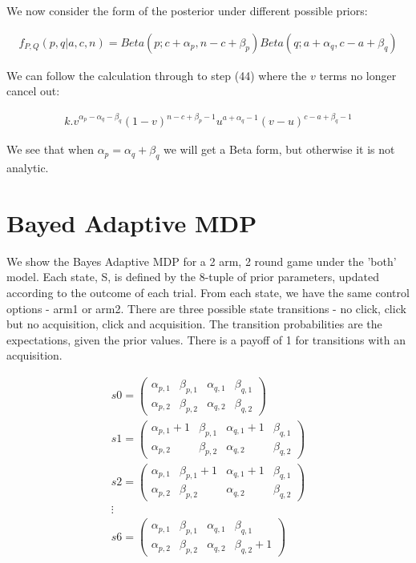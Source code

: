 \documentclass[11pt,a4,singlespacing,titlepagenumber=on]{scrreprt}
\numberwithin{equation}{chapter} %
\theoremstyle{remark}
\begin{document}
We now consider the form of the posterior under different possible priors:

\begin{align}
 f_{P,Q}(p,q|a,c,n) = Beta(p;c+\alpha_p,n-c+\beta_p) Beta(q;a+\alpha_q,c-a+\beta_q)
\end{align}

We can follow the calculation through to step (44) where the $v$ terms no longer cancel out:

\begin{align}
 k . v^{\alpha_p - \alpha_q - \beta_q}(1-v)^{n-c+\beta_p-1} u^{a+\alpha_q-1} (v - u)^{c-a+\beta_q-1}
\end{align}

We see that when $ \alpha_p = \alpha_q + \beta_q $ we will get a Beta form, but otherwise it is not analytic. 

\section{Bayed Adaptive MDP}

We show the Bayes Adaptive MDP for a 2 arm, 2 round game under the 'both' model. Each state, S, is defined by the 8-tuple of prior parameters, updated according to the outcome of each trial. From each state, we have the same control options - arm1 or arm2. There are three possible state transitions - no click, click but no acquisition, click and acquisition. The transition probabilities are the expectations, given the prior values. There is a payoff of 1 for transitions with an acquisition.

\begin{align}
s0 =
 \begin{pmatrix}
  \alpha_{p,1} & \beta_{p,1} & \alpha_{q,1} & \beta_{q,1} \\
  \alpha_{p,2} & \beta_{p,2} & \alpha_{q,2} & \beta_{q,2} 
 \end{pmatrix} \\
s1 =
  \begin{pmatrix}
   \alpha_{p,1}+1 & \beta_{p,1} & \alpha_{q,1}+1 & \beta_{q,1} \\
   \alpha_{p,2} & \beta_{p,2} & \alpha_{q,2} & \beta_{q,2} 
  \end{pmatrix} \\
s2 =
  \begin{pmatrix}
   \alpha_{p,1} & \beta_{p,1}+1 & \alpha_{q,1}+1 & \beta_{q,1} \\
   \alpha_{p,2} & \beta_{p,2} & \alpha_{q,2} & \beta_{q,2} 
  \end{pmatrix} \\
\vdots \\
s6 =
  \begin{pmatrix}
   \alpha_{p,1} & \beta_{p,1} & \alpha_{q,1} & \beta_{q,1} \\
   \alpha_{p,2} & \beta_{p,2} & \alpha_{q,2} & \beta_{q,2}+1 
  \end{pmatrix}
\end{align} 
\end{document}
